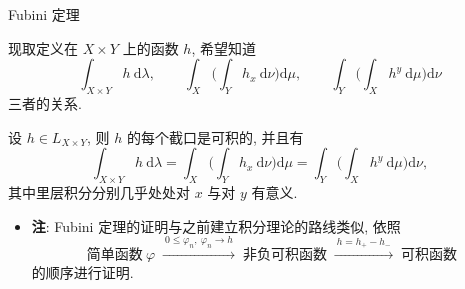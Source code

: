 
\begin{frame}{Fubini 定理}

现取定义在 $X \times Y$ 上的函数 $h$, 希望知道
\[
\int_{X \times Y} h ~ \mathrm{d}\lambda,
\qquad
\int_X \Big( \int_Y h_x ~ \mathrm{d}\nu \Big) \mathrm{d}\mu,
\qquad
\int_Y \Big( \int_X h^y ~ \mathrm{d}\mu \Big) \mathrm{d}\nu
\]
三者的关系.

\pause

\begin{thm}[Fubini 定理]
设 $h \in L_{X \times Y}$, 则 \textbf{} $h$ 的每个截口是可积的, 并且有 \textbf{}
\[
\int_{X \times Y} h ~ \mathrm{d}\lambda
= \int_X \Big( \int_Y h_x ~ \mathrm{d}\nu \Big) \mathrm{d}\mu
= \int_Y \Big( \int_X h^y ~ \mathrm{d}\mu \Big) \mathrm{d}\nu ,
\]
其中里层积分分别\alert{几乎处处}对 $x$ 与对 $y$ 有意义.
\end{thm}

\pause

\begin{itemize}
\item \textbf{注}: Fubini 定理的证明与之前建立积分理论的路线类似, 依照
\[
\text{简单函数}\ \varphi
\;\xrightarrow{\ 0 \leqslant \varphi_n,\ \varphi_n \to h\ }\;
\text{非负可积函数}
\;\xrightarrow{\ h = h_+ - h_-\ }\;
\text{可积函数}
\]
的顺序进行证明.
\end{itemize}

\end{frame}




